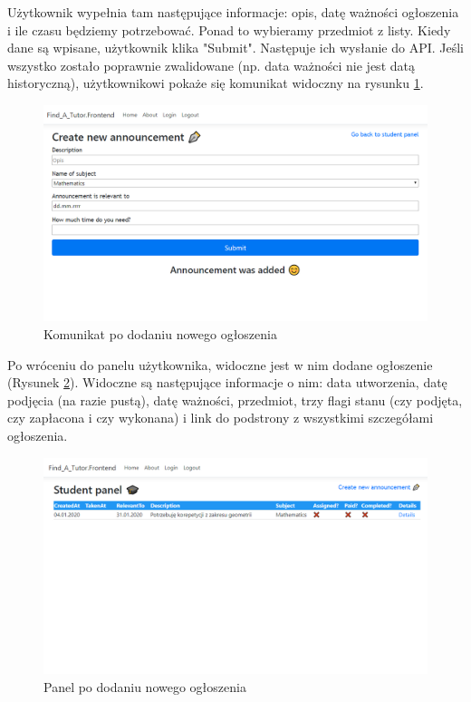 \documentclass[12pt]{article}
\numberwithin{figure}{section}
\begin{document}
\begin{sloppypar}
Użytkownik wypełnia tam następujące informacje: opis, datę ważności ogłoszenia i ile czasu będziemy potrzebować. Ponad to wybieramy przedmiot z listy. Kiedy dane są wpisane, użytkownik klika "Submit". Następuje ich wysłanie do API. Jeśli wszystko zostało poprawnie zwalidowane (np. data ważności nie jest datą historyczną), użytkownikowi pokaże się komunikat widoczny na rysunku \ref{fig:added}.
\begin{figure}[!htbp] 
    \centering
    \includegraphics[width=1\textwidth]{images/chapter_4/added.png}
    \caption{Komunikat po dodaniu nowego ogłoszenia}
    \label{fig:added}
\end{figure}

Po wróceniu do panelu użytkownika, widoczne jest w nim dodane ogłoszenie (Rysunek \ref{fig:student}).
Widoczne są następujące informacje o nim: data utworzenia, datę podjęcia (na razie pustą), datę ważności, przedmiot, trzy flagi stanu (czy podjęta, czy zapłacona i czy wykonana) i link do podstrony z wszystkimi szczegółami ogłoszenia.
\begin{figure}[!htbp] 
    \centering
    \includegraphics[width=1\textwidth]{images/chapter_4/student.png}
    \caption{Panel po dodaniu nowego ogłoszenia}
    \label{fig:student}
\end{figure}


\end{sloppypar}
\end{document}
